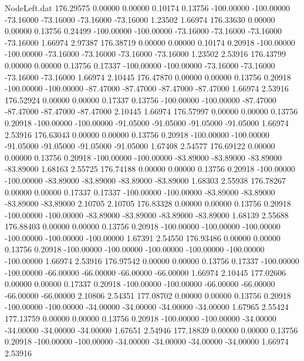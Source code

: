 \begin{filecontents}{NodeLeft.dat}
 176.29575    0.00000    0.00000     0.10174    0.13756 -100.00000 -100.00000  -73.16000  -73.16000  -73.16000  -73.16000    1.23502    1.66974
 176.33630    0.00000    0.00000     0.13756    0.24499 -100.00000 -100.00000  -73.16000  -73.16000  -73.16000  -73.16000    1.66974    2.97387
 176.38719    0.00000    0.00000     0.10174    0.20918 -100.00000 -100.00000  -73.16000  -73.16000  -73.16000  -73.16000    1.23502    2.53916
 176.43799    0.00000    0.00000     0.13756    0.17337 -100.00000 -100.00000  -73.16000  -73.16000  -73.16000  -73.16000    1.66974    2.10445
 176.47870    0.00000    0.00000     0.13756    0.20918 -100.00000 -100.00000  -87.47000  -87.47000  -87.47000  -87.47000    1.66974    2.53916
 176.52924    0.00000    0.00000     0.17337    0.13756 -100.00000 -100.00000  -87.47000  -87.47000  -87.47000  -87.47000    2.10445    1.66974
 176.57997    0.00000    0.00000     0.13756    0.20918 -100.00000 -100.00000  -91.05000  -91.05000  -91.05000  -91.05000    1.66974    2.53916
 176.63043    0.00000    0.00000     0.13756    0.20918 -100.00000 -100.00000  -91.05000  -91.05000  -91.05000  -91.05000    1.67408    2.54577
 176.69122    0.00000    0.00000     0.13756    0.20918 -100.00000 -100.00000  -83.89000  -83.89000  -83.89000  -83.89000    1.68163    2.55725
 176.74188    0.00000    0.00000     0.13756    0.20918 -100.00000 -100.00000  -83.89000  -83.89000  -83.89000  -83.89000    1.68303    2.55938
 176.78267    0.00000    0.00000     0.17337    0.17337 -100.00000 -100.00000  -83.89000  -83.89000  -83.89000  -83.89000    2.10705    2.10705
 176.83328    0.00000    0.00000     0.13756    0.20918 -100.00000 -100.00000  -83.89000  -83.89000  -83.89000  -83.89000    1.68139    2.55688
 176.88403    0.00000    0.00000     0.13756    0.20918 -100.00000 -100.00000 -100.00000 -100.00000 -100.00000 -100.00000    1.67391    2.54550
 176.93486    0.00000    0.00000     0.13756    0.20918 -100.00000 -100.00000 -100.00000 -100.00000 -100.00000 -100.00000    1.66974    2.53916
 176.97542    0.00000    0.00000     0.13756    0.17337 -100.00000 -100.00000  -66.00000  -66.00000  -66.00000  -66.00000    1.66974    2.10445
 177.02606    0.00000    0.00000     0.17337    0.20918 -100.00000 -100.00000  -66.00000  -66.00000  -66.00000  -66.00000    2.10806    2.54351
 177.08702    0.00000    0.00000     0.13756    0.20918 -100.00000 -100.00000  -34.00000  -34.00000  -34.00000  -34.00000    1.67965    2.55424
 177.13759    0.00000    0.00000     0.13756    0.20918 -100.00000 -100.00000  -34.00000  -34.00000  -34.00000  -34.00000    1.67651    2.54946
 177.18839    0.00000    0.00000     0.13756    0.20918 -100.00000 -100.00000  -34.00000  -34.00000  -34.00000  -34.00000    1.66974    2.53916

\end{filecontents}
